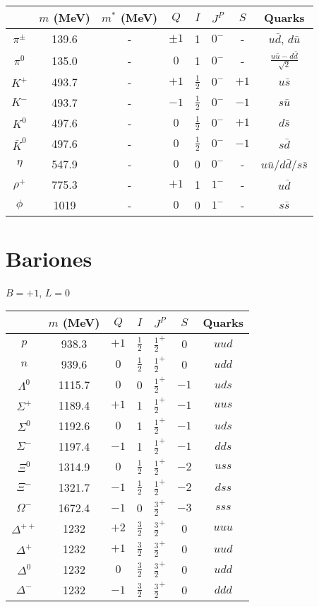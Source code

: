 \documentclass[10pt,twocolumn]{article}
\begin{document}
\begin{supertabular}{|c|c|c|c|c|c|c|c|}
\hline
 & $m$ (MeV) & $m^*$ (MeV) & $Q$ & $I$ & $J^P$ & $S$ & Quarks \\
\hline
$\pi^\pm$ & 139.6 & - & $\pm1$ & 1 & $0^-$ & - & $u\bar{d}$, $d\bar{u}$ \\
$\pi^0$ & 135.0 & - & $0$ & 1 & $0^-$ & - & $\frac{u\bar{u}-d\bar{d}}{\sqrt{2}}$ \\
$K^+$ & 493.7 & - & $+1$ & $\frac{1}{2}$ & $0^-$ & $+1$ & $u\bar{s}$ \\
$K^-$ & 493.7 & - & $-1$ & $\frac{1}{2}$ & $0^-$ & $-1$ & $s\bar{u}$ \\
$K^0$ & 497.6 & - & $0$ & $\frac{1}{2}$ & $0^-$ & $+1$ & $d\bar{s}$ \\
$\bar{K}^0$ & 497.6 & - & $0$ & $\frac{1}{2}$ & $0^-$ & $-1$ & $s\bar{d}$ \\
$\eta$ & 547.9 & - & $0$ & 0 & $0^-$ & - & $u\bar{u}$/$d\bar{d}$/$s\bar{s}$ \\
$\rho^+$ & 775.3 & - & $+1$ & 1 & $1^-$ & - & $u\bar{d}$ \\
$\phi$ & 1019 & - & $0$ & 0 & $1^-$ & - & $s\bar{s}$ \\
\hline
\end{supertabular}


\section*{Bariones}
$B = +1$, $L = 0$

\begin{supertabular}{|c|c|c|c|c|c|c|}
\hline
 & $m$ (MeV) & $Q$ & $I$ & $J^P$ & $S$ & Quarks \\
\hline
$p$ & 938.3 & $+1$ & $\frac{1}{2}$ & $\frac{1}{2}^+$ & 0 & $uud$ \\
$n$ & 939.6 & $0$ & $\frac{1}{2}$ & $\frac{1}{2}^+$ & 0 & $udd$ \\
$\Lambda^0$ & 1115.7 & $0$ & 0 & $\frac{1}{2}^+$ & $-1$ & $uds$ \\
$\Sigma^+$ & 1189.4 & $+1$ & 1 & $\frac{1}{2}^+$ & $-1$ & $uus$ \\
$\Sigma^0$ & 1192.6 & $0$ & 1 & $\frac{1}{2}^+$ & $-1$ & $uds$ \\
$\Sigma^-$ & 1197.4 & $-1$ & 1 & $\frac{1}{2}^+$ & $-1$ & $dds$ \\
$\Xi^0$ & 1314.9 & $0$ & $\frac{1}{2}$ & $\frac{1}{2}^+$ & $-2$ & $uss$ \\
$\Xi^-$ & 1321.7 & $-1$ & $\frac{1}{2}$ & $\frac{1}{2}^+$ & $-2$ & $dss$ \\
$\Omega^-$ & 1672.4 & $-1$ & 0 & $\frac{3}{2}^+$ & $-3$ & $sss$ \\
$\Delta^{++}$ & 1232 & $+2$ & $\frac{3}{2}$ & $\frac{3}{2}^+$ & 0 & $uuu$ \\
$\Delta^+$ & 1232 & $+1$ & $\frac{3}{2}$ & $\frac{3}{2}^+$ & 0 & $uud$ \\
$\Delta^0$ & 1232 & $0$ & $\frac{3}{2}$ & $\frac{3}{2}^+$ & 0 & $udd$ \\
$\Delta^-$ & 1232 & $-1$ & $\frac{3}{2}$ & $\frac{3}{2}^+$ & 0 & $ddd$ \\
\hline
\end{supertabular}
\end{document}
